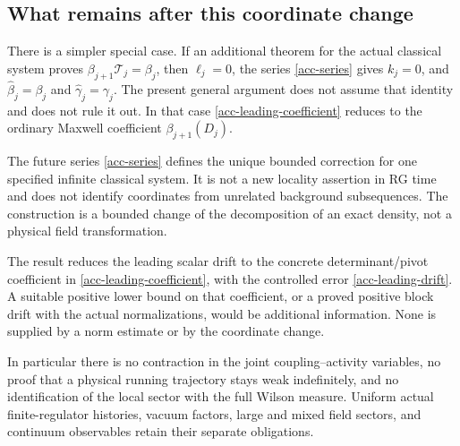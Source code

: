\subsection{What remains after this coordinate change}
\label{acc-scope-section}

There is a simpler special case. If an additional theorem for
the actual classical system proves
$\beta_{j+1}\mathcal T_j=\beta_j$, then $\ell_j=0$,
the series \eqref{acc-series} gives $k_j=0$, and
$\widehat\beta_j=\beta_j$ and
$\widehat\gamma_j=\gamma_j$. The present general argument
does not assume that identity and does not rule it out.
In that case \eqref{acc-leading-coefficient} reduces to
the ordinary Maxwell coefficient $\beta_{j+1}(D_j)$.

The future series \eqref{acc-series} defines the unique
bounded correction for one specified infinite classical
system. It is not a new locality assertion in RG time
and does not identify coordinates from unrelated
background subsequences. The construction is a bounded
change of the decomposition of an exact density, not a
physical field transformation.

The result reduces the leading scalar drift to the
concrete determinant/pivot coefficient in
\eqref{acc-leading-coefficient}, with the controlled
error \eqref{acc-leading-drift}. A suitable positive
lower bound on that coefficient, or a proved positive
block drift with the actual normalizations, would be
additional information. None is supplied by a norm
estimate or by the coordinate change.

In particular there is no contraction in the joint
coupling--activity variables, no proof that a physical
running trajectory stays weak indefinitely, and no
identification of the local sector with the full Wilson
measure. Uniform actual finite-regulator histories,
vacuum factors, large and mixed field sectors, and
continuum observables retain their separate obligations.
